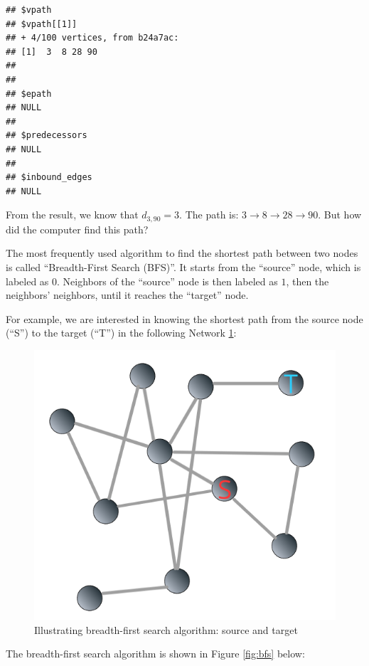 \documentclass[
]{krantz}
\begin{document}
\begin{verbatim}
## $vpath
## $vpath[[1]]
## + 4/100 vertices, from b24a7ac:
## [1]  3  8 28 90
## 
## 
## $epath
## NULL
## 
## $predecessors
## NULL
## 
## $inbound_edges
## NULL
\end{verbatim}

From the result, we know that \(d_{3, 90} = 3\). The path is: \(3 \to 8 \to 28 \to 90\). But how did the computer find this path?

The most frequently used algorithm to find the shortest path between two nodes is called ``Breadth-First Search (BFS)''. It starts from the ``source'' node, which is labeled as \(0\). Neighbors of the ``source'' node is then labeled as \(1\), then the neighbors' neighbors, until it reaches the ``target'' node.

For example, we are interested in knowing the shortest path from the source node (``S'') to the target (``T'') in the following Network \ref{fig:bfs01}:

\begin{figure}

{\centering \includegraphics[width=0.55\linewidth]{images/bfs01} 

}

\caption{Illustrating breadth-first search algorithm: source and target}\label{fig:bfs01}
\end{figure}

The breadth-first search algorithm is shown in Figure \ref{fig:bfs} below:
\end{document}
